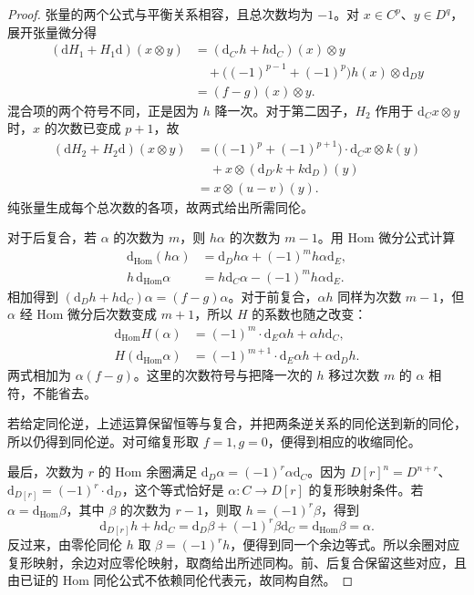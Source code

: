 \begin{proof}
	张量的两个公式与平衡关系相容，且总次数均为 \(-1\)。对 \(x\in C^p\)、\(y\in D^q\)，展开张量微分得
	\[
		\begin{aligned}
			(\mathrm{d}H_1+H_1\mathrm{d})(x\otimes y) &=(\mathrm{d}_{C'}h+h\mathrm{d}_C)(x)\otimes y\\
			&\quad+\bigl((-1)^{p-1}+(-1)^p\bigr) h(x)\otimes\mathrm{d}_Dy\\
			&=(f-g)(x)\otimes y.
		\end{aligned}
	\]
	混合项的两个符号不同，正是因为 \(h\) 降一次。对于第二因子，\(H_2\) 作用于 \(\mathrm{d}_Cx\otimes y\) 时，\(x\) 的次数已变成 \(p+1\)，故
	\[
		\begin{aligned}
			(\mathrm{d}H_2+H_2\mathrm{d})(x\otimes y) &=\bigl((-1)^p+(-1)^{p+1}\bigr) \cdot\mathrm{d}_Cx\otimes k(y)\\
			&\quad+x\otimes(\mathrm{d}_{D'}k+k\mathrm{d}_D)(y)\\
			&=x\otimes(u-v)(y).
		\end{aligned}
	\]
	纯张量生成每个总次数的各项，故两式给出所需同伦。

	对于后复合，若 \(\alpha\) 的次数为 \(m\)，则 \(h\alpha\) 的次数为 \(m-1\)。用 Hom 微分公式计算
	\[
		\begin{aligned}
			\mathrm{d}_{\mathrm{Hom}}(h\alpha) &=\mathrm{d}_Dh\alpha+(-1)^m h\alpha\mathrm{d}_E,\\
			h\,\mathrm{d}_{\mathrm{Hom}}\alpha &=h\mathrm{d}_C\alpha-(-1)^m h\alpha\mathrm{d}_E.
		\end{aligned}
	\]
	相加得到 \((\mathrm{d}_Dh+h\mathrm{d}_C)\alpha=(f-g)\alpha\)。对于前复合，\(\alpha h\) 同样为次数 \(m-1\)，但 \(\alpha\) 经 Hom 微分后次数变成 \(m+1\)，所以 \(H\) 的系数也随之改变：
	\[
		\begin{aligned}
			\mathrm{d}_{\mathrm{Hom}}H(\alpha) &=(-1)^m\cdot\mathrm{d}_E\alpha h+\alpha h\mathrm{d}_C,\\
			H(\mathrm{d}_{\mathrm{Hom}}\alpha) &=(-1)^{m+1}\cdot\mathrm{d}_E\alpha h+\alpha\mathrm{d}_Dh.
		\end{aligned}
	\]
	两式相加为 \(\alpha(f-g)\)。这里的次数符号与把降一次的 \(h\) 移过次数 \(m\) 的 \(\alpha\) 相符，不能省去。

	若给定同伦逆，上述运算保留恒等与复合，并把两条逆关系的同伦送到新的同伦，所以仍得到同伦逆。对可缩复形取 \(f=1,g=0\)，便得到相应的收缩同伦。

	最后，次数为 \(r\) 的 Hom 余圈满足 \(\mathrm{d}_D\alpha=(-1)^r\alpha\mathrm{d}_C\)。因为 \(D[r]^n=D^{n+r}\)、\(\mathrm{d}_{D[r]}=(-1)^r\cdot\mathrm{d}_D\)，这个等式恰好是 \(\alpha:C\to D[r]\) 的复形映射条件。若 \(\alpha=\mathrm{d}_{\mathrm{Hom}}\beta\)，其中 \(\beta\) 的次数为 \(r-1\)，则取 \(h=(-1)^r\beta\)，得到
	\[
		\mathrm{d}_{D[r]}h+h\mathrm{d}_C =\mathrm{d}_D\beta+(-1)^r\beta\mathrm{d}_C =\mathrm{d}_{\mathrm{Hom}}\beta=\alpha.
	\]
	反过来，由零伦同伦 \(h\) 取 \(\beta=(-1)^r h\)，便得到同一个余边等式。所以余圈对应复形映射，余边对应零伦映射，取商给出所述同构。前、后复合保留这些对应，且由已证的 Hom 同伦公式不依赖同伦代表元，故同构自然。
\end{proof}
